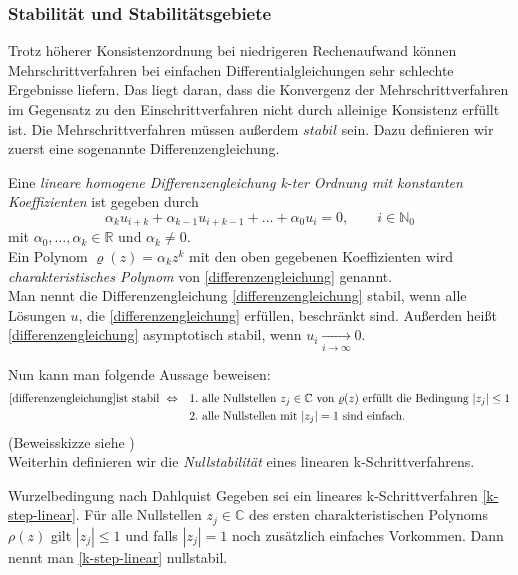 \subsubsection{Stabilität und Stabilitätsgebiete}
Trotz höherer Konsistenzordnung bei niedrigeren Rechenaufwand können Mehrschrittverfahren bei einfachen
Differentialgleichungen sehr schlechte Ergebnisse liefern. Das liegt daran, dass die Konvergenz der Mehrschrittverfahren
im Gegensatz zu den Einschrittverfahren nicht durch alleinige Konsistenz erfüllt ist. Die Mehrschrittverfahren müssen
außerdem $stabil$ sein. Dazu definieren  wir zuerst eine sogenannte Differenzengleichung.\\
\begin{definition}
    Eine \textit{lineare homogene Differenzengleichung k-ter Ordnung mit konstanten Koeffizienten} ist gegeben durch
    \begin{equation}
        \label{differenzengleichung}
        \alpha_k u_{i+k} + \alpha_{k-1} u_{i+k-1} + \dots + \alpha_0 u_i =0, \qquad i \in \mathbb{N}_0
    \end{equation}
    mit $\alpha_0, \dots, \alpha_k \in \mathbb{R}$ und $\alpha_k \neq 0$.\\
    Ein Polynom $\varrho(z) = \alpha_k z^k$ mit den oben gegebenen Koeffizienten wird \textit{charakteristisches Polynom}
    von \eqref{differenzengleichung} genannt.\\
    Man nennt die Differenzengleichung \eqref{differenzengleichung} stabil, wenn alle Lösungen $u$, die
    \eqref{differenzengleichung} erfüllen, beschränkt sind. Außerden heißt \eqref{differenzengleichung} asymptotisch
    stabil, wenn $u_i \underset{i \rightarrow \infty}{\rightarrow} 0$.
\end{definition}
Nun kann man folgende Aussage beweisen:
\begin{align*}
    \eqref{differenzengleichung} \text{ist stabil } \Leftrightarrow \quad &1. \text{ alle Nullstellen } z_j \in
    \mathbb{C} \text{ von } \varrho(z) \text{ erfüllt die Bedingung } |z_j| \leq 1 \\
    &2. \text{ alle Nullstellen mit } |z_j| = 1 \text{ sind einfach}.
\end{align*}
(Beweisskizze siehe \cite[101]{stykelSkriptZurVorlesung2020})\\
Weiterhin definieren wir die \textit{Nullstabilität} eines linearen k-Schrittverfahrens.
\begin{definition}{Wurzelbedingung nach Dahlquist}
    Gegeben sei ein lineares k-Schrittverfahren \eqref{k-step-linear}. Für alle Nullstellen $z_j \in \mathbb{C}$
    des ersten charakteristischen Polynoms $\rho(z)$ gilt $|z_j| \leq 1$ und falls $|z_j| = 1$ noch zusätzlich einfaches
    Vorkommen. Dann nennt man \eqref{k-step-linear} nullstabil.
\end{definition}
